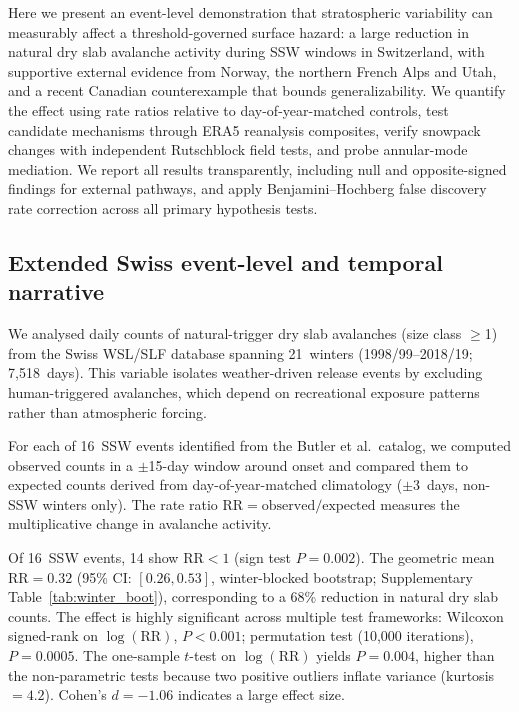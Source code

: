 \documentclass[11pt,letterpaper]{article}
\begin{document}
Here we present an event-level demonstration that stratospheric variability can measurably affect a threshold-governed surface hazard: a large reduction in natural dry slab avalanche activity during SSW windows in Switzerland, with supportive external evidence from Norway, the northern French Alps and Utah, and a recent Canadian counterexample that bounds generalizability. We quantify the effect using rate ratios relative to day-of-year-matched controls, test candidate mechanisms through ERA5 reanalysis composites, verify snowpack changes with independent Rutschblock field tests, and probe annular-mode mediation. We report all results transparently, including null and opposite-signed findings for external pathways, and apply Benjamini--Hochberg false discovery rate correction across all primary hypothesis tests.

\subsection*{Extended Swiss event-level and temporal narrative}

We analysed daily counts of natural-trigger dry slab avalanches (size class $\geq$1) from the Swiss WSL/SLF database spanning 21~winters (1998/99--2018/19; 7,518~days). This variable isolates weather-driven release events by excluding human-triggered avalanches, which depend on recreational exposure patterns rather than atmospheric forcing.

For each of 16~SSW events identified from the Butler et al.\ catalog\cite{Butler2015}, we computed observed counts in a $\pm$15-day window around onset and compared them to expected counts derived from day-of-year-matched climatology ($\pm$3~days, non-SSW winters only). The rate ratio $\mathrm{RR} = \mathrm{observed} / \mathrm{expected}$ measures the multiplicative change in avalanche activity.

Of 16~SSW events, 14 show $\mathrm{RR} < 1$ (sign test $P = 0.002$). The geometric mean $\mathrm{RR} = 0.32$ (95\% CI: $[0.26, 0.53]$, winter-blocked bootstrap; Supplementary Table~\ref{tab:winter_boot}), corresponding to a 68\% reduction in natural dry slab counts. The effect is highly significant across multiple test frameworks: Wilcoxon signed-rank on $\log(\mathrm{RR})$, $P < 0.001$; permutation test (10,000 iterations), $P = 0.0005$. The one-sample $t$-test on $\log(\mathrm{RR})$ yields $P = 0.004$, higher than the non-parametric tests because two positive outliers inflate variance (kurtosis~$= 4.2$). Cohen's $d = -1.06$ indicates a large effect size.
\end{document}
